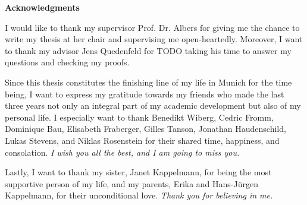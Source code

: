 \thispagestyle{empty}
\vspace*{20mm}

\begin{center}
\textbf{{Acknowledgments}}
\end{center}

\vspace{10mm}
I would like to thank my supervisor Prof. Dr. Albers for giving me the chance to write my thesis at her chair and supervising me open-heartedly. Moreover, I want to thank my advisor Jens Quedenfeld for TODO taking his time to answer my questions and checking my proofs.

Since this thesis constitutes the finishing line of my life in Munich for the time being, I want to express my gratitude towards my friends who made the last three years not only an integral part of my academic development but also of my personal life. I especially want to thank Benedikt Wiberg, Cedric Fromm, Dominique Bau, Elisabeth Fraberger, Gilles Tanson, Jonathan Haudenschild, Lukas Stevens, and Niklas Rosenstein for their shared time, happiness, and consolation. \emph{I wish you all the best, and I am going to miss you.}

Lastly, I want to thank my sister, Janet Kappelmann, for being the most supportive person of my life, and my parents, Erika and Hans-Jürgen Kappelmann, for their unconditional love. \emph{Thank you for believing in me.}

\cleardoublepage{}
